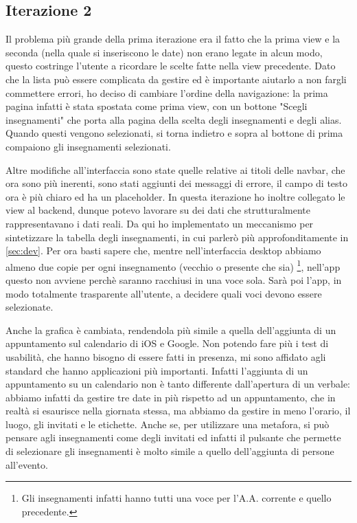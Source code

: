 \documentclass[Lau, oneside, noexaminfo]{sapthesis}%
\begin{document}
\subsection{Iterazione 2}
Il problema più grande della prima iterazione era il fatto che la prima view e la seconda (nella quale si inseriscono le date) non erano legate in alcun modo, questo costringe l'utente a ricordare le scelte fatte nella view precedente. Dato che la lista può essere complicata da gestire ed è importante aiutarlo a non fargli commettere errori, ho deciso di cambiare l'ordine della navigazione: la prima pagina infatti è stata spostata come prima view, con un bottone "Scegli insegnamenti" che porta alla pagina della scelta degli insegnamenti e degli alias. Quando questi vengono selezionati, si torna indietro e sopra al bottone di prima compaiono gli insegnamenti selezionati.

Altre modifiche all'interfaccia sono state quelle relative ai titoli delle navbar, che ora sono più inerenti, sono stati aggiunti dei messaggi di errore, il campo di testo ora è più chiaro ed ha un placeholder. In questa iterazione ho inoltre collegato le view al backend, dunque potevo lavorare su dei dati che strutturalmente rappresentavano i dati reali. Da qui ho implementato un meccanismo per sintetizzare la tabella degli insegnamenti, in cui parlerò più approfonditamente in \ref{sec:dev}. Per ora basti sapere che, mentre nell'interfaccia desktop abbiamo almeno due copie per ogni insegnamento (vecchio o presente che sia) \footnote{Gli insegnamenti infatti hanno tutti una voce per l'A.A. corrente e quello precedente.}, nell'app questo non avviene perchè saranno racchiusi in una voce sola. Sarà poi l'app, in modo totalmente trasparente all'utente, a decidere quali voci devono essere selezionate.

Anche la grafica è cambiata, rendendola più simile a quella dell'aggiunta di un appuntamento sul calendario di iOS e Google. Non potendo fare più i test di usabilità, che hanno bisogno di essere fatti in presenza, mi sono affidato agli standard che hanno applicazioni più importanti. Infatti l'aggiunta di un appuntamento su un calendario non è tanto differente dall'apertura di un verbale: abbiamo infatti da gestire tre date in più rispetto ad un appuntamento, che in realtà si esaurisce nella giornata stessa, ma abbiamo da gestire in meno l'orario, il luogo, gli invitati e le etichette. Anche se, per utilizzare una metafora, si può pensare agli insegnamenti come degli invitati ed infatti il pulsante che permette di selezionare gli insegnamenti è molto simile a quello dell'aggiunta di persone all'evento.
\end{document}
